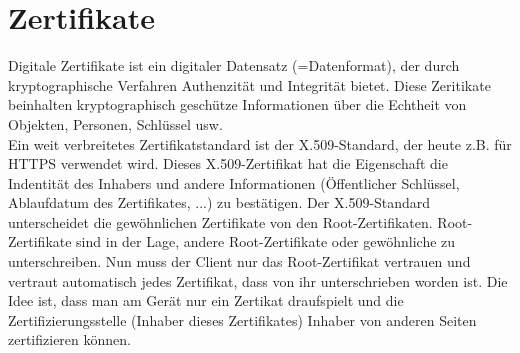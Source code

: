 \section{Zertifikate}

Digitale Zertifikate ist ein digitaler Datensatz (=Datenformat), der durch kryptographische Verfahren Authenzität und Integrität bietet. Diese Zeritikate beinhalten kryptographisch geschütze Informationen über die Echtheit von Objekten, Personen, Schlüssel usw.\\
Ein weit verbreitetes Zertifikatstandard ist der X.509-Standard, der heute z.B. für HTTPS verwendet wird. Dieses X.509-Zertifikat hat die Eigenschaft die Indentität des Inhabers und andere Informationen (Öffentlicher Schlüssel, Ablaufdatum des Zertifikates, ...) zu bestätigen. Der X.509-Standard unterscheidet die gewöhnlichen Zertifikate von den Root-Zertifikaten. Root-Zertifikate sind in der Lage, andere Root-Zertifikate oder gewöhnliche zu unterschreiben. Nun muss der Client nur das Root-Zertifikat vertrauen und vertraut automatisch jedes Zertifikat, dass von ihr unterschrieben worden ist. Die Idee ist, dass man am Gerät nur ein Zertikat draufspielt und die Zertifizierungsstelle (Inhaber dieses Zertifikates) Inhaber von anderen Seiten zertifizieren können.
